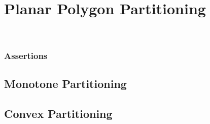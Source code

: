 \chapter{Planar Polygon Partitioning}
\label{partition_2}

\\



\label{partition_2_intro}


\subsection*{Assertions}
\label{partition_2_assertions}


\section{Monotone Partitioning}
\label{partition_2_monotone}


\section{Convex Partitioning}
\label{partition_2_convex}


